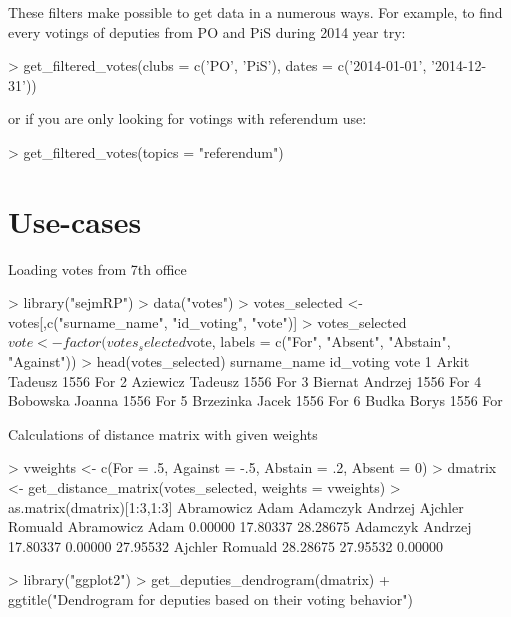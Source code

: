 These filters make possible to get data in a numerous ways. For example, to find every votings of deputies from PO and PiS during 2014 year try:

\begin{example}
> get_filtered_votes(clubs = c('PO', 'PiS'), dates = c('2014-01-01', '2014-12-31'))
\end{example}

or if you are only looking for votings with referendum use:

\begin{example}
> get_filtered_votes(topics = "referendum")
\end{example}

\section{Use-cases}


Loading votes from 7th office

\begin{example}
> library("sejmRP")
> data("votes")
> votes_selected <- votes[,c("surname_name", "id_voting", "vote")]
> votes_selected$vote <- factor(votes_selected$vote, labels = c("For", "Absent", "Abstain", "Against"))
> head(votes_selected)
        surname_name id_voting vote
1      Arkit Tadeusz      1556   For
2   Aziewicz Tadeusz      1556   For
3    Biernat Andrzej      1556   For
4    Bobowska Joanna      1556   For
5    Brzezinka Jacek      1556   For
6        Budka Borys      1556   For
\end{example}

Calculations of distance matrix with given weights

\begin{example}
> vweights <- c(For = .5, Against = -.5, Abstain = .2, Absent = 0)
> dmatrix <- get_distance_matrix(votes_selected, weights = vweights)
> as.matrix(dmatrix)[1:3,1:3]
                 Abramowicz Adam Adamczyk Andrzej Ajchler Romuald
Abramowicz Adam          0.00000         17.80337        28.28675
Adamczyk Andrzej        17.80337          0.00000        27.95532
Ajchler Romuald         28.28675         27.95532         0.00000
\end{example}



\begin{example}
> library("ggplot2")
> get_deputies_dendrogram(dmatrix) + ggtitle("Dendrogram for deputies based on their voting behavior")
\end{example}

